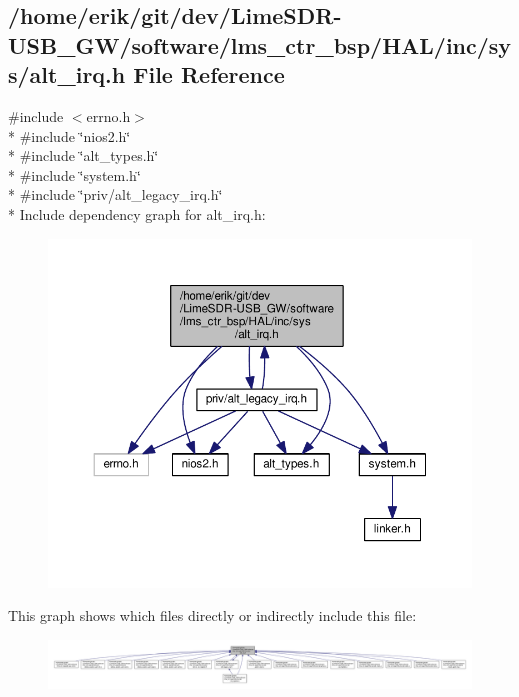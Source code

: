 \subsection{/home/erik/git/dev/\+Lime\+S\+D\+R-\/\+U\+S\+B\+\_\+\+G\+W/software/lms\+\_\+ctr\+\_\+bsp/\+H\+A\+L/inc/sys/alt\+\_\+irq.h File Reference}
\label{alt__irq_8h}
{\ttfamily \#include $<$errno.\+h$>$}\\*
{\ttfamily \#include \char`\"{}nios2.\+h\char`\"{}}\\*
{\ttfamily \#include \char`\"{}alt\+\_\+types.\+h\char`\"{}}\\*
{\ttfamily \#include \char`\"{}system.\+h\char`\"{}}\\*
{\ttfamily \#include \char`\"{}priv/alt\+\_\+legacy\+\_\+irq.\+h\char`\"{}}\\*
Include dependency graph for alt\+\_\+irq.\+h\+:
\nopagebreak
\begin{figure}[H]
\begin{center}
\leavevmode
\includegraphics[width=350pt]{d0/d44/alt__irq_8h__incl}
\end{center}
\end{figure}
This graph shows which files directly or indirectly include this file\+:
\nopagebreak
\begin{figure}[H]
\begin{center}
\leavevmode
\includegraphics[width=350pt]{d8/d65/alt__irq_8h__dep__incl}
\end{center}
\end{figure}
